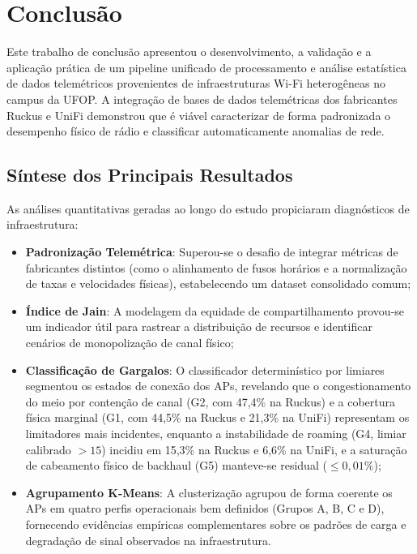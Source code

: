 \chapter{Conclusão}
\label{cap:conclusao}

Este trabalho de conclusão apresentou o desenvolvimento, a validação e a aplicação prática de um pipeline unificado de processamento e análise estatística de dados telemétricos provenientes de infraestruturas Wi-Fi heterogêneas no campus da UFOP. A integração de bases de dados telemétricas dos fabricantes Ruckus e UniFi demonstrou que é viável caracterizar de forma padronizada o desempenho físico de rádio e classificar automaticamente anomalias de rede.

\section{Síntese dos Principais Resultados}
\label{sec:conclusao_resultados}

As análises quantitativas geradas ao longo do estudo propiciaram diagnósticos de infraestrutura:
\begin{itemize}
	\item \textbf{Padronização Telemétrica}: Superou-se o desafio de integrar métricas de fabricantes distintos (como o alinhamento de fusos horários e a normalização de taxas e velocidades físicas), estabelecendo um dataset consolidado comum;
	\item \textbf{Índice de Jain}: A modelagem da equidade de compartilhamento provou-se um indicador útil para rastrear a distribuição de recursos e identificar cenários de monopolização de canal físico;
	\item \textbf{Classificação de Gargalos}: O classificador determinístico por limiares segmentou os estados de conexão dos APs, revelando que o congestionamento do meio por contenção de canal (G2, com 47,4\% na Ruckus) e a cobertura física marginal (G1, com 44,5\% na Ruckus e 21,3\% na UniFi) representam os limitadores mais incidentes, enquanto a instabilidade de roaming (G4, limiar calibrado $> 15$) incidiu em 15,3\% na Ruckus e 6,6\% na UniFi, e a saturação de cabeamento físico de backhaul (G5) manteve-se residual ($\le 0,01\%$);
	\item \textbf{Agrupamento K-Means}: A clusterização agrupou de forma coerente os APs em quatro perfis operacionais bem definidos (Grupos A, B, C e D), fornecendo evidências empíricas complementares sobre os padrões de carga e degradação de sinal observados na infraestrutura.
\end{itemize}

